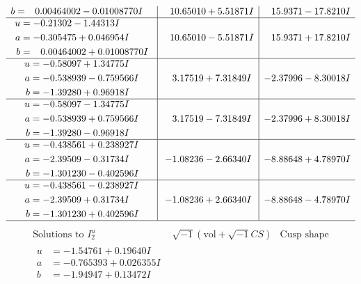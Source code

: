 \documentclass[1p]{elsarticle_modified}
\theoremstyle{definition}
\newcommand{\I}{\sqrt{-1}}
\begin{document}
$$\begin{array}{c|c|c}
\begin{aligned}
b &= \phantom{-}0.00464002 - 0.01008770 I\end{aligned}
 & \phantom{-}10.65010 + 5.51871 I & \phantom{-}15.9371 - 17.8210 I \\ \hline\begin{aligned}
u &= -0.21302 - 1.44313 I \\
a &= -0.305475 + 0.046954 I \\
b &= \phantom{-}0.00464002 + 0.01008770 I\end{aligned}
 & \phantom{-}10.65010 - 5.51871 I & \phantom{-}15.9371 + 17.8210 I \\ \hline\begin{aligned}
u &= -0.58097 + 1.34775 I \\
a &= -0.538939 - 0.759566 I \\
b &= -1.39280 + 0.96918 I\end{aligned}
 & \phantom{-}3.17519 + 7.31849 I & -2.37996 - 8.30018 I \\ \hline\begin{aligned}
u &= -0.58097 - 1.34775 I \\
a &= -0.538939 + 0.759566 I \\
b &= -1.39280 - 0.96918 I\end{aligned}
 & \phantom{-}3.17519 - 7.31849 I & -2.37996 + 8.30018 I \\ \hline\begin{aligned}
u &= -0.438561 + 0.238927 I \\
a &= -2.39509 - 0.31734 I \\
b &= -1.301230 - 0.402596 I\end{aligned}
 & -1.08236 - 2.66340 I & -8.88648 + 4.78970 I \\ \hline\begin{aligned}
u &= -0.438561 - 0.238927 I \\
a &= -2.39509 + 0.31734 I \\
b &= -1.301230 + 0.402596 I\end{aligned}
 & -1.08236 + 2.66340 I & -8.88648 - 4.78970 I\\
 \hline 
 \end{array}$$\newpage$$\begin{array}{c|c|c}  
\text{Solutions to }I^u_{2}& \I (\text{vol} + \sqrt{-1}CS) & \text{Cusp shape}\\
 \hline 
\begin{aligned}
u &= -1.54761 + 0.19640 I \\
a &= -0.765393 + 0.026355 I \\
b &= -1.94947 + 0.13472 I\end{aligned}

\end{array}$$
\end{document}
